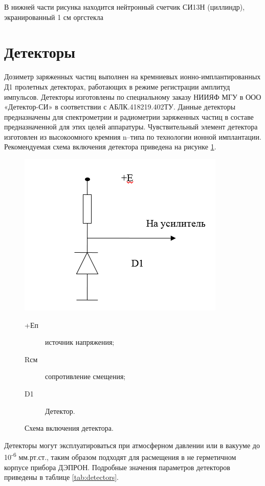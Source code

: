 В нижней части рисунка находится нейтронный счетчик СИ13Н (циллиндр), экранированный 1 см оргстекла

\section{Детекторы}

Дозиметр заряженных частиц выполнен на кремниевых ионно-имплантированных Д1 пролетных детекторах, работающих в режиме регистрации амплитуд импульсов. Детекторы изготовлены по специальному заказу НИИЯФ МГУ в ООО «Детектор-СИ» в соответствии с АБЛК.418219.402ТУ. Данные детекторы предназначены для спектрометрии и радиометрии заряженных частиц в составе предназначенной для этих целей аппаратуры. Чувствительный элемент детектора изготовлен из высокоомного кремния n--типа по технологии ионной имплантации. Рекомендуемая схема включения детектора приведена на рисунке \ref{fig:detector_sch}. 


\begin{figure}[h]
	\centering
	\includegraphics[width=0.5\linewidth]{images/detector_sch}
	\caption{Схема включения детектора.}
	\medskip
	\small
	\begin{description}
		\item[+Еп] источник напряжения;
		\item[Rсм] сопротивление смещения;
		\item[D1] Детектор.
	\end{description}			
	\label{fig:detector_sch}
\end{figure}
	


Детекторы могут эксплуатироваться при атмосферном давлении или в вакууме до 10\textsuperscript{-6} мм.рт.ст., таким образом подходят для расмещения в не герметичном корпусе прибора ДЭПРОН. Подробные значения параметров детекторов приведены в таблице \ref{tab:detectors}.

